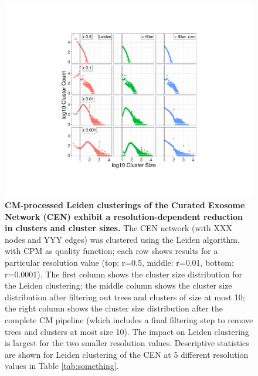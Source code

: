 \documentclass[11pt]{article}   	%
\begin{document}
\begin{figure}[H]
\centering
\includegraphics[width=0.8\linewidth]{figs/fig2_kn.pdf}
\caption{\textbf{CM-processed Leiden clusterings of the Curated Exosome Network (CEN) exhibit a resolution-dependent reduction in clusters and cluster sizes.}
The CEN network (with XXX nodes and YYY edges) was clustered using the Leiden algorithm, with CPM as quality function; each row shows results for a particular resolution value (top: r=0.5, middle: r=0.01, bottom: r=0.0001).
The first column shows the cluster size distribution for the Leiden clustering; the middle column shows the cluster size distribution after filtering out trees and clusters of size at most 10; the right column shows the cluster size distribution after the complete CM pipeline (which includes a final filtering step to remove trees and clusters at most size 10).
The impact on Leiden clustering is largest for the two smaller resolution values.
Descriptive statistics are shown for Leiden clustering of the CEN at 5 different resolution values in Table \ref{tab:something}.}
\label{fig:CEN_size_count_plots_leiden}
\end{figure}
\end{document}
